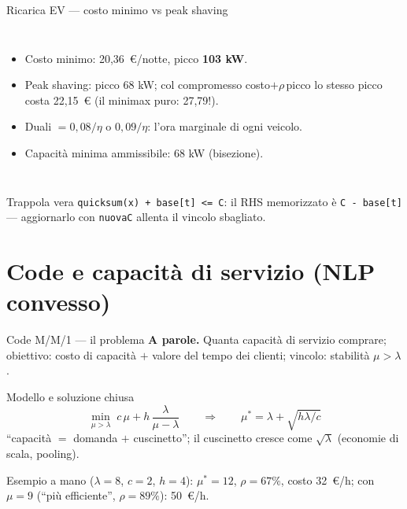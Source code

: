\documentclass[11pt,aspectratio=169]{beamer}
\begin{document}
\begin{frame}{Ricarica EV --- costo minimo vs peak shaving}
\begin{columns}
\small
\begin{itemize}
  \item Costo minimo: 20,36~\euro/notte, picco \textbf{103 kW}.
  \item Peak shaving: picco 68 kW; col compromesso costo$+\rho\,$picco lo stesso
        picco costa 22,15~\euro{} (il minimax puro: 27,79!).
  \item Duali $= 0{,}08/\eta$ o $0{,}09/\eta$: l'ora marginale di ogni veicolo.
  \item Capacità minima ammissibile: 68 kW (bisezione).
\end{itemize}
\end{columns}
\begin{block}{Trappola vera}
\texttt{quicksum(x) + base[t] <= C}: il RHS memorizzato è \texttt{C - base[t]} ---
aggiornarlo con \texttt{nuovaC} allenta il vincolo sbagliato.
\end{block}
\end{frame}

\section{Code e capacità di servizio (NLP convesso)}

\begin{frame}{Code M/M/1 --- il problema}
\textbf{A parole.} Quanta capacità di servizio comprare; obiettivo: costo di
capacità $+$ valore del tempo dei clienti; vincolo: stabilità $\mu > \lambda$.
\begin{block}{Modello e soluzione chiusa}
\vspace{-1ex}
\[
\min_{\mu > \lambda} \; c\,\mu + h\,\frac{\lambda}{\mu - \lambda}
\qquad\Longrightarrow\qquad
\mu^* = \lambda + \sqrt{h\lambda/c}
\]
``capacità $=$ domanda $+$ \alert{cuscinetto}''; il cuscinetto cresce come
$\sqrt\lambda$ (economie di scala, pooling).
\end{block}
Esempio a mano ($\lambda = 8$, $c = 2$, $h = 4$): $\mu^* = 12$, $\rho = 67\%$,
costo 32~\euro/h; con $\mu = 9$ (``più efficiente'', $\rho = 89\%$): 50~\euro/h.
\end{frame}
\end{document}
